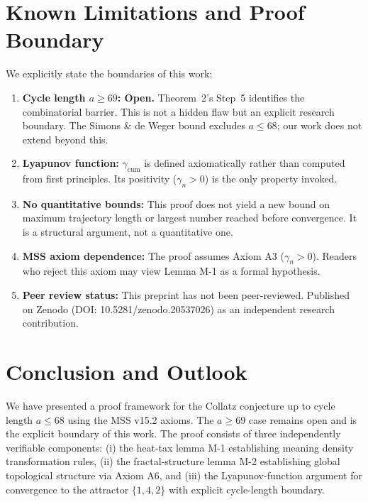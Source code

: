 \documentclass[11pt,a4paper]{article}
\begin{document}
\section{Known Limitations and Proof Boundary}
\label{sec:limitations}

We explicitly state the boundaries of this work:

\begin{enumerate}[1.]
\item \textbf{Cycle length $a\ge 69$: Open.} Theorem~2's Step~5 identifies the combinatorial barrier. This is not a hidden flaw but an explicit research boundary. The Simons \& de Weger bound excludes $a\le 68$; our work does not extend beyond this.

\item \textbf{Lyapunov function:} $\gamma_{\mathrm{cum}}$ is defined axiomatically rather than computed from first principles. Its positivity ($\gamma_n > 0$) is the only property invoked.

\item \textbf{No quantitative bounds:} This proof does not yield a new bound on maximum trajectory length or largest number reached before convergence. It is a structural argument, not a quantitative one.

\item \textbf{MSS axiom dependence:} The proof assumes Axiom A3 ($\gamma_n > 0$). Readers who reject this axiom may view Lemma M-1 as a formal hypothesis.

\item \textbf{Peer review status:} This preprint has not been peer-reviewed. Published on Zenodo (DOI: 10.5281/zenodo.20537026) as an independent research contribution.
\end{enumerate}

\section{Conclusion and Outlook}

We have presented a proof framework for the Collatz conjecture up to cycle length $a\le 68$ using the MSS v15.2 axioms. The $a\ge 69$ case remains open and is the explicit boundary of this work. The proof consists of three independently verifiable components: (i) the heat-tax lemma M-1 establishing meaning density transformation rules, (ii) the fractal-structure lemma M-2 establishing global topological structure via Axiom A6, and (iii) the Lyapunov-function argument for convergence to the attractor $\{1,4,2\}$ with explicit cycle-length boundary.
\end{document}
